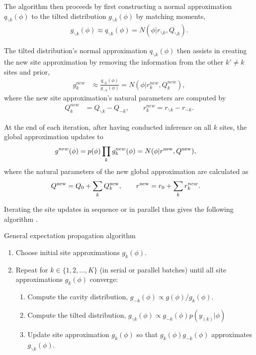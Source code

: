 The algorithm then proceeds by first constructing a normal approximation $q_{\backslash k}(\phi)$ to the tilted distribution $g_{\backslash k}(\phi)$ by matching moments,
\begin{align}
g_{\backslash k} (\phi) 
\approx q_{\backslash k}(\phi) = N(\phi | r_{\backslash k}, Q_{\backslash k}). 
\label{eq:ep_tilted_approx}
\end{align}

The tilted distribution's normal approximation $q_{\backslash k}(\phi)$ then assists in creating the new site approximation by removing the information from the other $k' \neq k$ sites and prior,
\begin{align}
g_k^{new} 
&\approx \frac{q_{\backslash k}(\phi)}{g_{-k}(\phi)} 
= N(\phi | r_k^{new}, Q_k^{new}),
\end{align}
where the new site approximation's natural parameters are computed by
\begin{align}
Q_k^{new}
&= Q_{\backslash k} - Q_{-k}, \qquad
r_k^{new}
= r_{\backslash k} - r_{-k}. \label{eq:ep_site_approx}
\end{align}

At the end of each iteration, after having conducted inference on all $k$ sites, the global approximation updates to
\begin{align}
g^{new}(\phi) 
&= p(\phi) \prod_k g_k^{new}(\phi) 
= N(\phi | r^{\rm new}, Q^{\rm new}),
\end{align}
where the natural parameters of the new global approximation are calculated as
\begin{align}
Q^{\rm new} 
&= Q_0 + \sum_{k} Q_k^{\rm new}, \qquad
r^{\rm new}
= r_0 + \sum_{k} r_k^{new}.
\end{align}
 
Iterating the site updates in sequence or in parallel thus gives the following algorithm \citep{Gelman+others:2017}.
\\[2mm]
\begin{minipage}{\linewidth}
\begin{framed}
General expectation propagation algorithm
\begin{enumerate}
\item Choose initial site approximations $g_k(\phi)$.
\item Repeat for $k \in \{1,2,\dots,K\}$ (in serial or parallel batches) until all site approximations $g_k(\phi)$ converge:
    \begin{enumerate}
    \item Compute the cavity distribution, $g_{-k}(\phi) \propto g(\phi)/g_k(\phi)$.
    \item Compute the tilted distribution, $g_{\backslash k}(\phi) \propto g_{-k}(\phi) p(y_{(k)} | \phi) $
    \item \label{alg:tilted_approx} Update site approximation $g_k(\phi)$ so that $g_k(\phi) g_{-k}(\phi)$ approximates $g_{\backslash k}(\phi)$.
    \end{enumerate}
\end{enumerate}
\end{framed}
\end{minipage}\\[2mm]

